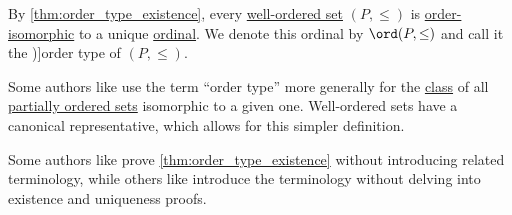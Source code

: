 \begin{definition}\label{def:well_ordered_order_type}\mimprovised
  By \cref{thm:order_type_existence}, every \hyperref[def:well_ordered_set]{well-ordered set} \( (P, \leq) \) is \hyperref[def:partially_ordered_set/morphism]{order-isomorphic} to a unique \hyperref[def:ordinal]{ordinal}. We denote this ordinal by \( \ord(P, \leq) \) and call it the \term[en=order type (\cite[5]{Engelking1989GeneralTopology})]{order type} of \( (P, \leq) \).
\end{definition}
\begin{comments}
  \item Some authors like \textcite[def. 9.5]{Harzheim2005OrderedSets} use the term \enquote{order type} more generally for the \hyperref[con:set_theory_class]{class} of all \hyperref[def:partially_ordered_set]{partially ordered sets} isomorphic to a given one. Well-ordered sets have a canonical representative, which allows for this simpler definition.

  Some authors like \textcite[thm. 2.12]{Jech2006SetTheory} prove \cref{thm:order_type_existence} without introducing related terminology, while others like \textcite[5]{Engelking1989GeneralTopology} introduce the terminology without delving into existence and uniqueness proofs.
\end{comments}

